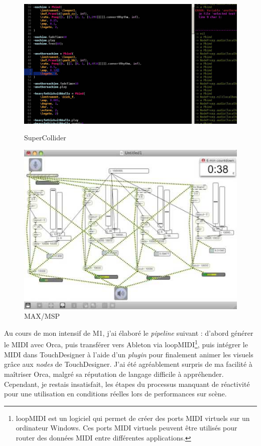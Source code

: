 \begin{figure}[h]
  \begin{minipage}[b]{0.45\linewidth}
    \centering
    \includegraphics[width=\linewidth]{images/experiments/supercollider00.jpg}
    \caption{SuperCollider}
    \label{sc00}
  \end{minipage}
  \hspace{0.1\linewidth} %
  \begin{minipage}[b]{0.45\linewidth}
    \centering
    \includegraphics[width=\linewidth]{images/experiments/maxmsp00.jpg}
    \caption{MAX/MSP}
    \label{maxmsp00}
  \end{minipage}
\end{figure}


Au cours de mon intensif de M1, j'ai élaboré le \textit{pipeline} suivant : d'abord générer le MIDI avec Orca, puis transférer vers Ableton via loopMIDI\footnote{loopMIDI est un logiciel qui permet de créer des ports MIDI virtuels sur un ordinateur Windows. Ces ports MIDI virtuels peuvent être utilisés pour router des données MIDI entre différentes applications.}, puis intégrer le MIDI dans TouchDesigner à l'aide d'un \textit{plugin} pour finalement animer les visuels grâce aux \textit{nodes} de TouchDesigner. J'ai été agréablement surpris de ma facilité à maîtriser Orca, malgré sa réputation de langage difficile à appréhender. Cependant, je restais insatisfait, les étapes du processus manquant de réactivité pour une utilisation en conditions réelles lors de performances sur scène.


